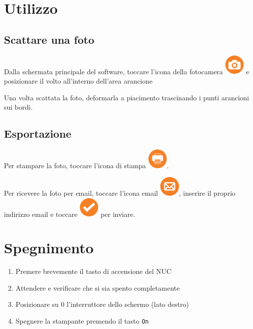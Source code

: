 \documentclass[12pt]{article}
\begin{document}
		
		
\section{Utilizzo}

	\subsection{Scattare una foto}

		Dalla schermata principale del software, toccare l'icona della fotocamera \includegraphics[width=1cm]{../src/resource/icons/camera.png} e posizionare il volto all'interno dell'area arancione
		
		Una volta scattata la foto, deformarla a piacimento trascinando i punti arancioni sui bordi.        
	
	
	\subsection{Esportazione}
	
		Per stampare la foto, toccare l'icona di stampa \includegraphics[width=1cm]{../src/resource/icons/print.png}.
		
		Per ricevere la foto per email, toccare l'icona email \includegraphics[width=1cm]{../src/resource/icons/mail.png}, inserire il proprio indirizzo email e toccare \includegraphics[width=1cm]{../src/resource/icons/ok.png} per inviare.
		
	
	
\section{Spegnimento}
	
		\begin{enumerate}
			\item Premere brevemente il tasto di accensione del NUC
			\item Attendere e verificare che si sia spento completamente
			\item Posizionare su 0 l'interruttore dello schermo (lato destro)
			\item Spegnere la stampante premendo il tasto \texttt{On}
		\end{enumerate}
	
\end{document}
